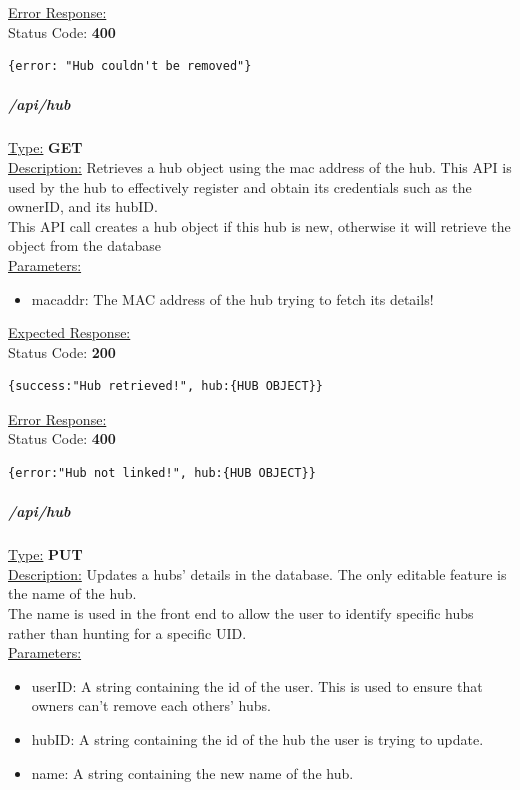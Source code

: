 \documentclass[draft,preprint,12pt,3p]{elsarticle}
\newcommand{\forceindent}{\leavevmode{\parindent=1em\indent}}
\begin{document}
\underline{Error Response:}\\[5pt]
\forceindent Status Code: \textbf{400} \\
\begin{verbatim}
{error: "Hub couldn't be removed"}
\end{verbatim}


\subparagraph*{/api/hub}
\underline{Type:} \textbf{GET}\\

\underline{Description:} Retrieves a hub object using the mac address of the hub. This API is used by the hub to effectively register and obtain its credentials such as the ownerID, and its hubID.\\
This API call creates a hub object if this hub is new, otherwise it will retrieve the object from the database\\

\underline{Parameters:}
\begin{itemize}
\item macaddr: The MAC address of the hub trying to fetch its details!
\end{itemize}
\underline{Expected Response:}\\[5pt]
\forceindent Status Code: \textbf{200} \\
\begin{verbatim}
{success:"Hub retrieved!", hub:{HUB OBJECT}}
\end{verbatim}

\underline{Error Response:}\\[5pt]
\forceindent Status Code: \textbf{400} \\
\begin{verbatim}
{error:"Hub not linked!", hub:{HUB OBJECT}}
\end{verbatim}

\subparagraph*{/api/hub}
\underline{Type:} \textbf{PUT}\\

\underline{Description:} Updates a hubs' details in the database. The only editable feature is the name of the hub.\\
The name is used in the front end to allow the user to identify specific hubs rather than hunting for a specific UID.\\

\underline{Parameters:}
\begin{itemize}
\item userID: A string containing the id of the user. This is used to ensure that owners can't remove each others' hubs.

\item hubID: A string containing the id of the hub the user is trying to update.

\item name: A string containing the new name of the hub.
\end{itemize}
\end{document}
